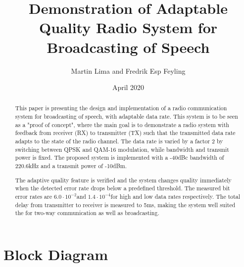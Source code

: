 \documentclass[9pt,journal]{IEEEtran}
\title{Demonstration of Adaptable Quality Radio System for Broadcasting of Speech}
\author{Martin Lima and Fredrik Esp Feyling }
\date{April 2020}
\newcommand{\measBW}{220.6} %
\newcommand{\measPWR}{-10} %
\newcommand{\measDelay}{5} %
\newcommand{\measBERQAMGood}{$6.0\cdot10^{-2}$}
\newcommand{\measBERQPSKBad}{$1.4\cdot10^{-4}$}
\begin{document}
\maketitle
\begin{abstract} 
This paper is presenting the design and implementation of a radio communication system for broadcasting of speech, with adaptable data rate. This system is to be seen as a "proof of concept", where the main goal is to demonstrate a radio system with feedback from receiver (RX) to transmitter (TX) such that the transmitted data rate adapts to the state of the radio channel. The data rate is varied by a factor 2 by switching between QPSK and QAM-16 modulation, while bandwidth and transmit power is fixed. The proposed system is implemented with a -40dBc bandwidth of \measBW kHz and a transmit power of \measPWR dBm.

The adaptive quality feature is verified and the system changes quality immediately when the detected error rate drops below a predefined threshold. The measured bit error rates are \measBERQAMGood  and \measBERQPSKBad for high and low data rates respectively. The total delay from transmitter to receiver is measured to \measDelay ms, making the system well suited the for two-way communication as well as broadcasting. 
\end{abstract}


















\appendices

\section{Block Diagram}
\label{a:block_diagram}


\end{document}
